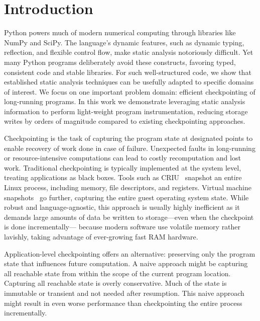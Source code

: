 \section{Introduction}
Python powers much of modern numerical computing through libraries like NumPy and SciPy. The language's dynamic features, such as dynamic typing, reflection, and flexible control flow, make static analysis notoriously difficult. Yet many Python programs deliberately avoid these constructs, favoring typed, consistent code and stable libraries. For such well-structured code, we show that established static analysis techniques can be usefully adapted to specific domains of interest. We focus on one important problem domain: efficient checkpointing of long-running programs. 
In this work we demonstrate leveraging static analysis information to perform light-weight program instrumentation, reducing storage writes by orders of magnitude compared to existing checkpointing approaches.

Checkpointing is the task of capturing the program state at designated points to enable recovery of work done in case of failure. Unexpected faults in long-running or resource-intensive computations can lead to costly recomputation and lost work. Traditional checkpointing is typically implemented at the system level, treating applications as black boxes. Tools such as CRIU~\cite{CRIUProject} snapshot an entire Linux process, including memory, file descriptors, and registers. Virtual machine snapshots~\cite{VMwareSnapshot, RedHatVMSnapshot} go further, capturing the entire guest operating system state. While robust and language-agnostic, this approach is usually highly inefficient as it demands large amounts of data be written to storage---even when the checkpoint is done incrementally---%
because modern software use volatile memory rather lavishly, 
taking advantage of ever-growing fast RAM hardware.

Application-level checkpointing offers an alternative: preserving only the program state that influences future computation. A naive approach might be capturing all reachable state from within the scope of the current program location. Capturing all reachable state is overly conservative. Much of the state is immutable or transient and not needed after resumption.  This naive approach might result in even worse performance than checkpointing the entire process incrementally.


